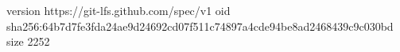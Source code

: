 version https://git-lfs.github.com/spec/v1
oid sha256:64b7d7fe3fda24ae9d24692cd07f511c74897a4cde94be8ad2468439c9c030bd
size 2252
